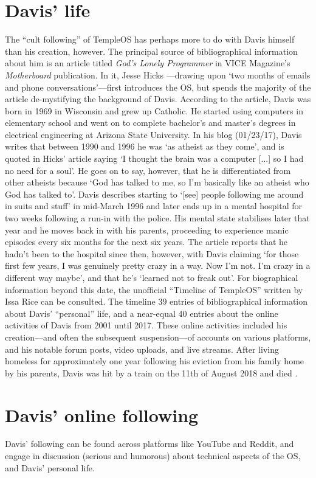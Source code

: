 \documentclass[Draft.tex]{subfiles}
\begin{document}
\section*{Davis' life}
The ``cult following'' of TempleOS has perhaps
more to do with Davis himself than his creation, however.
The principal source of bibliographical information about him is
an article titled \textit{God’s Lonely Programmer}
in VICE Magazine’s \textit{Motherboard} publication.
In it, Jesse Hicks \parencite*{Hicks14}---drawing
upon `two months of emails and phone conversations'---first
introduces the OS,
but spends the majority of the article de-mystifying the background of Davis.
According to the article,
Davis was born in 1969 in Wisconsin and grew up Catholic.
He started using computers in elementary school
and went on to complete bachelor's and master's degrees
in electrical engineering at Arizona State University.
In his blog (01/23/17), Davis writes that
between 1990 and 1996 he was `as atheist as they come',
and is quoted in Hicks' article saying
`I thought the brain was a computer [...] so I had no need for a soul'.
He goes on to say, however, that he is differentiated from other atheists
because `God has talked to me,
so I'm basically like an atheist who God has talked to'.
Davis describes starting to
`[see] people following me around in suits and stuff' in mid-March 1996
and later ends up in a mental hospital for two weeks
following a run-in with the police.
His mental state stabilises later that year
and he moves back in with his parents,
proceeding to experience manic episodes every six months for the next six years.
The article reports that he hadn't been to the hospital since then, however,
with Davis claiming
`for those first few years, I was genuinely pretty crazy in a way.
Now I'm not. I'm crazy in a different way maybe',
and that he's `learned not to freak out'.
For biographical information beyond this date,
the unofficial ``Timeline of TempleOS'' written by Issa Rice
\parencite*{Rice18} can be consulted.
The timeline 39 entries of bibliographical information
about Davis' ``personal'' life, and a near-equal 40 entries about
the online activities of Davis from 2001 until 2017.
These online activities included his creation---and
often the subsequent suspension---of accounts on various platforms,
and his notable forum posts, video uploads, and live streams.
After living homeless for approximately one year following
his eviction from his family home by his parents,
Davis was hit by a train on the 11th of August 2018 and died \parencite{Cecil18}.


\section*{Davis' online following}
Davis' following can be found across platforms like YouTube and Reddit,
and engage in discussion (serious and humorous) about
technical aspects of the OS, and Davis’ personal life.
\end{document}
